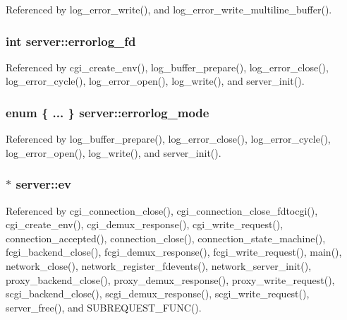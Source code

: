 Referenced by log\-\_\-error\-\_\-write(), and log\-\_\-error\-\_\-write\-\_\-multiline\-\_\-buffer().

\hypertarget{structserver_a2344112517b6ad3b3effba4d90b066f2}{
\subsubsection[{errorlog\-\_\-fd}]{\setlength{\rightskip}{0pt plus 5cm}int server\-::errorlog\-\_\-fd}}\label{structserver_a2344112517b6ad3b3effba4d90b066f2}


Referenced by cgi\-\_\-create\-\_\-env(), log\-\_\-buffer\-\_\-prepare(), log\-\_\-error\-\_\-close(), log\-\_\-error\-\_\-cycle(), log\-\_\-error\-\_\-open(), log\-\_\-write(), and server\-\_\-init().

\hypertarget{structserver_aa46064efff0a347249d0769903a6d1f7}{
\subsubsection[{errorlog\-\_\-mode}]{\setlength{\rightskip}{0pt plus 5cm}enum \{ ... \}   server\-::errorlog\-\_\-mode}}\label{structserver_aa46064efff0a347249d0769903a6d1f7}


Referenced by log\-\_\-buffer\-\_\-prepare(), log\-\_\-error\-\_\-close(), log\-\_\-error\-\_\-cycle(), log\-\_\-error\-\_\-open(), log\-\_\-write(), and server\-\_\-init().

\hypertarget{structserver_a3f826cecce3b94fffab041f62192b7f8}{
\subsubsection[{ev}]{$\ast$ server\-::ev}}\label{structserver_a3f826cecce3b94fffab041f62192b7f8}


Referenced by cgi\-\_\-connection\-\_\-close(), cgi\-\_\-connection\-\_\-close\-\_\-fdtocgi(), cgi\-\_\-create\-\_\-env(), cgi\-\_\-demux\-\_\-response(), cgi\-\_\-write\-\_\-request(), connection\-\_\-accepted(), connection\-\_\-close(), connection\-\_\-state\-\_\-machine(), fcgi\-\_\-backend\-\_\-close(), fcgi\-\_\-demux\-\_\-response(), fcgi\-\_\-write\-\_\-request(), main(), network\-\_\-close(), network\-\_\-register\-\_\-fdevents(), network\-\_\-server\-\_\-init(), proxy\-\_\-backend\-\_\-close(), proxy\-\_\-demux\-\_\-response(), proxy\-\_\-write\-\_\-request(), scgi\-\_\-backend\-\_\-close(), scgi\-\_\-demux\-\_\-response(), scgi\-\_\-write\-\_\-request(), server\-\_\-free(), and S\-U\-B\-R\-E\-Q\-U\-E\-S\-T\-\_\-\-F\-U\-N\-C().

